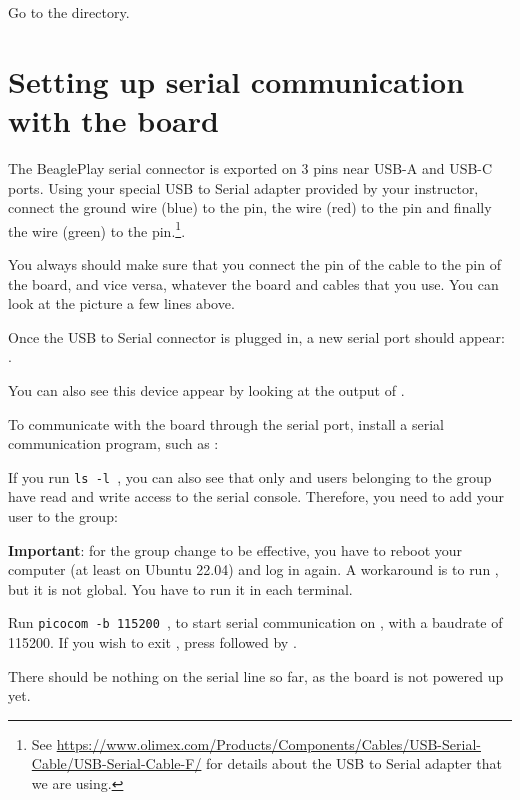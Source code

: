 Go to the  directory.

\section{Setting up serial communication with the board}
The BeaglePlay serial connector is exported on 3 pins near USB-A
and USB-C ports. Using your special USB to Serial adapter provided
by your instructor, connect the ground wire (blue) to the  pin, the
 wire (red) to the  pin and finally the  wire (green)
to the  pin.\footnote{See
\url{https://www.olimex.com/Products/Components/Cables/USB-Serial-Cable/USB-Serial-Cable-F/}
for details about the USB to Serial adapter that we are using.}.

You always should make sure that you connect the  pin of the cable
to the  pin of the board, and vice versa, whatever the board and
cables that you use. You can look at the picture a few lines above.

Once the USB to Serial connector is plugged in, a new serial port
should appear: .

You can also see this device appear by looking at the output of
.

To communicate with the board through the serial port, install a
serial communication program, such as :


If you run {\tt ls -l \hosttty}, you can also see that only
 and users belonging to the  group have
read and write access to the serial console. Therefore, you need
to add your user to the  group:


{\bf Important}: for the group change to be effective, you have to
reboot your computer (at least on Ubuntu 22.04) and log in again.
A workaround is to run , but it is not global.
You have to run it in each terminal.

Run {\tt picocom -b 115200 \hosttty}, to start serial
communication on {\tt \hosttty}, with a baudrate of 115200.
If you wish to exit , press \code{[Ctrl][a]} followed by
\code{[Ctrl][x]}.

There should be nothing on the serial line so far, as the board is not
powered up yet.

